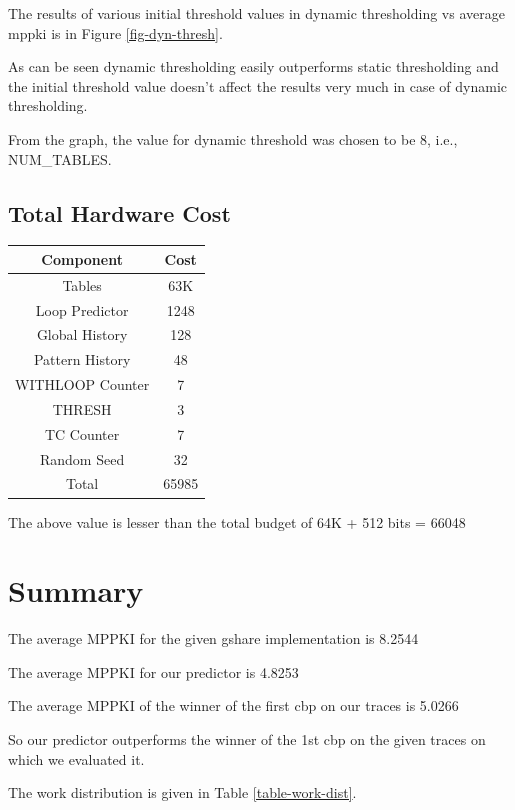 \documentclass{sig-alternate}
\begin{document}
The results of various initial threshold values in dynamic thresholding vs
average mppki is in Figure \ref{fig-dyn-thresh}.

As can be seen dynamic thresholding easily outperforms static thresholding and
the initial threshold value doesn't affect the results very much in case of
dynamic thresholding.

From the graph, the value for dynamic threshold was chosen to be 8, i.e.,
NUM\_TABLES.

\subsection{Total Hardware Cost}

\begin{center}
  \begin{tabular}{ | c | c | }
    \hline
    Component & Cost \\
    \hline
    Tables & 63K \\ 
    Loop Predictor & 1248 \\  
    Global History & 128 \\
    Pattern History & 48 \\
    WITHLOOP Counter & 7 \\
    THRESH & 3 \\
    TC Counter & 7 \\
    Random Seed & 32 \\
    \hline
    Total & 65985 \\
    \hline
  \end{tabular}
\end{center}

The above value is lesser than the total budget of 64K + 512 bits = 66048
\section{Summary}
\label{sec-summary}

The average MPPKI for the given gshare implementation \cite{combine-bp} is 8.2544

The average MPPKI for our predictor is 4.8253

The average MPPKI of the winner of the first cbp \cite{cbp1.1} on our traces is 5.0266

So our predictor outperforms the winner of the 1st cbp on the given traces on
which we evaluated it.

The work distribution is given in Table \ref{table-work-dist}.
\end{document}
